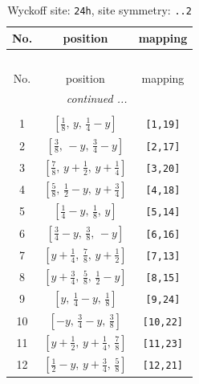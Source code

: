 \documentclass[fleqn,8pt]{jsarticle}
\begin{document}
\begin{longtable}{ccc}
\caption{Wyckoff site: {\tt 24h}, site symmetry: {\tt ..2}}
 \\
 \hline \hline
No. & position & mapping \\ \hline \endfirsthead

\multicolumn{2}{l}{\tablename\ \thetable{}} \\
 \hline \hline
No. & position & mapping \\ \hline \endhead

 \hline \hline
\multicolumn{2}{r}{\footnotesize\it continued ...} \\ \endfoot

 \hline \hline
\multicolumn{2}{r}{} \\ \endlastfoot

1 & $\left[ \frac{1}{8},\, y,\, \frac{1}{4} - y \right]$ & {\tt [1,19]} \\ \hline
2 & $\left[ \frac{3}{8},\, - y,\, \frac{3}{4} - y \right]$ & {\tt [2,17]} \\ \hline
3 & $\left[ \frac{7}{8},\, y + \frac{1}{2},\, y + \frac{1}{4} \right]$ & {\tt [3,20]} \\ \hline
4 & $\left[ \frac{5}{8},\, \frac{1}{2} - y,\, y + \frac{3}{4} \right]$ & {\tt [4,18]} \\ \hline
5 & $\left[ \frac{1}{4} - y,\, \frac{1}{8},\, y \right]$ & {\tt [5,14]} \\ \hline
6 & $\left[ \frac{3}{4} - y,\, \frac{3}{8},\, - y \right]$ & {\tt [6,16]} \\ \hline
7 & $\left[ y + \frac{1}{4},\, \frac{7}{8},\, y + \frac{1}{2} \right]$ & {\tt [7,13]} \\ \hline
8 & $\left[ y + \frac{3}{4},\, \frac{5}{8},\, \frac{1}{2} - y \right]$ & {\tt [8,15]} \\ \hline
9 & $\left[ y,\, \frac{1}{4} - y,\, \frac{1}{8} \right]$ & {\tt [9,24]} \\ \hline
10 & $\left[ - y,\, \frac{3}{4} - y,\, \frac{3}{8} \right]$ & {\tt [10,22]} \\ \hline
11 & $\left[ y + \frac{1}{2},\, y + \frac{1}{4},\, \frac{7}{8} \right]$ & {\tt [11,23]} \\ \hline
12 & $\left[ \frac{1}{2} - y,\, y + \frac{3}{4},\, \frac{5}{8} \right]$ & {\tt [12,21]} \\
\end{longtable}
\renewcommand{\arraystretch}{1.2}
\end{document}
